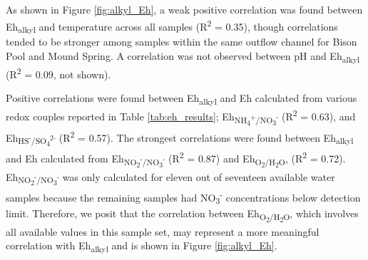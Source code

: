 





As shown in Figure \ref{fig:alkyl_Eh}, a weak positive correlation was found between Eh\textsubscript{alkyl} and temperature across all samples (R\textsuperscript{2} = 0.35), though correlations tended to be stronger among samples within the same outflow channel for Bison Pool and Mound Spring. A correlation was not observed between pH and Eh\textsubscript{alkyl} (R\textsuperscript{2} = 0.09, not shown).

Positive correlations were found between Eh\textsubscript{alkyl} and Eh calculated from various redox couples reported in Table \ref{tab:eh_results}; Eh\textsubscript{NH\textsubscript{4}\textsuperscript{+}/NO\textsubscript{3}\textsuperscript{-}} (R\textsuperscript{2} = 0.63), and Eh\textsubscript{HS\textsuperscript{-}/SO\textsubscript{4}\textsuperscript{2-}} (R\textsuperscript{2} = 0.57). The strongest correlations were found between Eh\textsubscript{alkyl} and Eh calculated from Eh\textsubscript{NO\textsubscript{2}\textsuperscript{-}/NO\textsubscript{3}\textsuperscript{-}} (R\textsuperscript{2} = 0.87) and Eh\textsubscript{O\textsubscript{2}/H\textsubscript{2}O}, (R\textsuperscript{2} = 0.72). Eh\textsubscript{NO\textsubscript{2}\textsuperscript{-}/NO\textsubscript{3}\textsuperscript{-}} was only calculated for eleven out of seventeen available water samples because the remaining samples had NO\textsubscript{3}\textsuperscript{-} concentrations below detection limit. Therefore, we posit that the correlation between Eh\textsubscript{O\textsubscript{2}/H\textsubscript{2}O}, which involves all available values in this sample set, may represent a more meaningful correlation with Eh\textsubscript{alkyl} and is shown in Figure \ref{fig:alkyl_Eh}.


